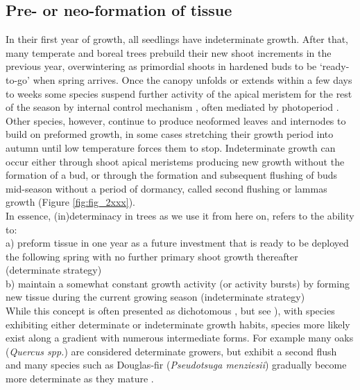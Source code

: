 \documentclass{article}
\begin{document}
	
	
	
	\subsection*{Pre- or neo-formation of tissue}
	In their first year of growth, all seedlings have indeterminate growth. After that, many temperate and boreal trees prebuild their new shoot increments in the previous year, overwintering as primordial shoots in hardened buds to be `ready-to-go' when spring arrives. Once the canopy unfolds or extends within a few days to weeks some species suspend further activity of the apical meristem for the rest of the season by internal control mechanism \citep[paradormancy,][]{langEndoParaEcodormancy1987}, often mediated by photoperiod \citep{bohleniusCOFTRegulatory2006a}. Other species, however, continue to produce neoformed leaves and internodes to build on preformed growth, in some cases stretching their growth period into autumn until low temperature forces them to stop. Indeterminate growth can occur either through shoot apical meristems producing new growth without the formation of a bud, or through the formation and subsequent flushing of buds mid-season without a period of dormancy, called second flushing or lammas growth (Figure \ref{fig:fig_2xxx}). \\
	In essence, (in)determinacy in trees as we use it from here on, refers to the ability to:\\
	a) preform tissue in one year as a future investment that is ready to be deployed the following spring with no further primary shoot growth thereafter (determinate strategy)\\
	b) maintain a somewhat constant growth activity (or activity bursts) by forming new tissue during the current growing season (indeterminate strategy)\\

While this concept is often presented as dichotomous \citep{kozlowskiGrowthControlWoody1997, lechowiczWhyTemperateDeciduous1984a}, but see \citealp{kikuzawaLeafSurvivalWoody1983, damascosBudCompositionBranching2005}), with species exhibiting either determinate or indeterminate growth habits, species more likely exist along a gradient with numerous intermediate forms. For example many oaks (\textit{Quercus spp.}) are considered determinate growers, but exhibit a second flush and many species such as Douglas-fir (\textit{Pseudotsuga menziesii}) gradually become more determinate as they mature \citep{borchertConceptJuvenilityWoody1976, heuretOntogeneticTrendsMorphological2006}.\\
\end{document}
